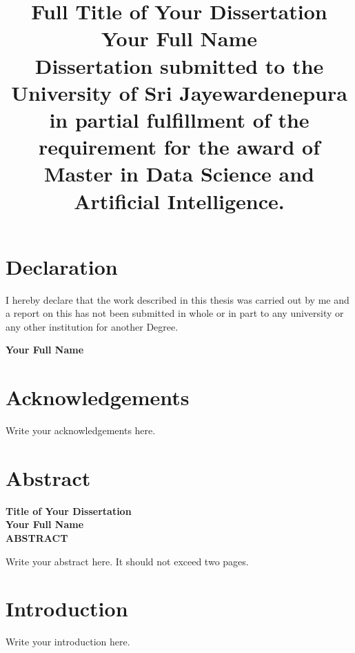 \documentclass[12pt,a4paper]{article}
\title{
    \vspace{2cm}
    \textbf{Full Title of Your Dissertation} \\
    \vspace{1cm}
    \large{Your Full Name} \\
    \vspace{1cm}
    \normalsize{Dissertation submitted to the University of Sri Jayewardenepura in partial fulfillment of the requirement for the award of Master in Data Science and Artificial Intelligence.}
}
\author{}
\date{}
\begin{document}
\maketitle
\thispagestyle{empty} %
\newpage

\section*{Declaration}
\vspace{1cm}
I hereby declare that the work described in this thesis was carried out by me and a report on this has not been submitted in whole or in part to any university or any other institution for another Degree.

\vspace{2cm}
\textbf{Your Full Name}

\newpage

\tableofcontents
\newpage

\listoftables
\listoffigures
\newpage

\section*{Acknowledgements}
Write your acknowledgements here.

\newpage

\section*{Abstract}
\begin{center}
    \textbf{Title of Your Dissertation} \\
    \vspace{0.5cm}
    \textbf{Your Full Name} \\
    \vspace{0.5cm}
    \textbf{ABSTRACT}
\end{center}
\vspace{1cm}
Write your abstract here. It should not exceed two pages.

\newpage

\section{Introduction}
Write your introduction here.
\end{document}
